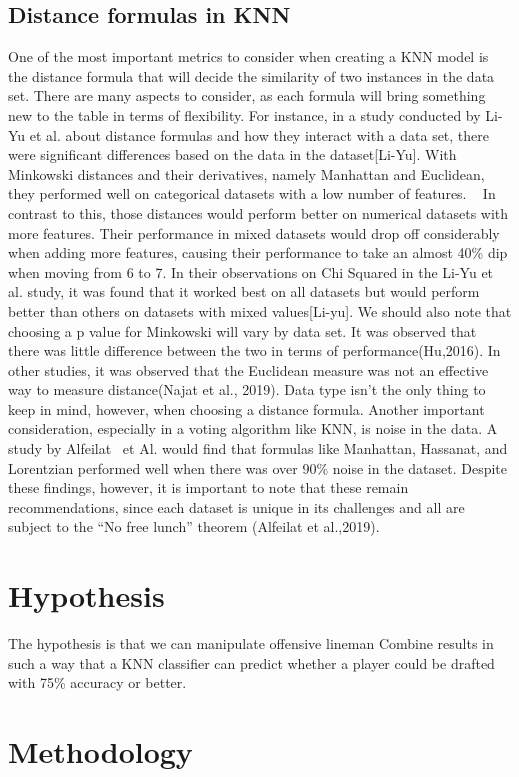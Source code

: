 \documentclass[confrence]{IEEEtran}
\begin{document}
\subsection*{Distance formulas in KNN}
One of the most important metrics to consider when creating a KNN model is the distance formula that will decide the similarity of two instances in the data set.
There are many aspects to consider, as each formula will bring something new to the table in terms of flexibility. For instance, in a study conducted by Li-Yu et al. about distance formulas and how they interact with a data set, there were significant differences based on the data in the dataset[Li-Yu].
With Minkowski distances and their derivatives, namely Manhattan and Euclidean, they performed well on categorical datasets with a low number of features.  
In contrast to this, those distances would perform better on numerical datasets with more features.
Their performance in mixed datasets would drop off considerably when adding more features, causing their performance to take an almost 40\% dip when moving from 6 to 7.
In their observations on Chi Squared in the Li-Yu et al. study, it was found that it worked best on all datasets but would perform better than others on datasets with mixed values[Li-yu].
We should also note that choosing a p value for Minkowski will vary by data set. It was observed that there was little difference between the two in terms of performance(Hu,2016).
In other studies, it was observed that the Euclidean measure was not an effective way to measure distance(Najat et al., 2019). Data type isn't the only thing to keep in mind, however, when choosing a distance formula.
Another important consideration, especially in a voting algorithm like KNN, is noise in the data. A study by Alfeilat  et Al. would find that formulas like Manhattan, Hassanat, and Lorentzian performed well when there was over 90\% noise in the dataset.
Despite these findings, however, it is important to note that these remain recommendations, since each dataset is unique in its challenges and all are subject to the “No free lunch” theorem (Alfeilat et al.,2019).
\section*{Hypothesis}
The hypothesis is that we can manipulate offensive lineman Combine results in such a way that a KNN classifier can predict whether a player could be drafted with 75\% accuracy or better.
\section*{Methodology}
\end{document}
